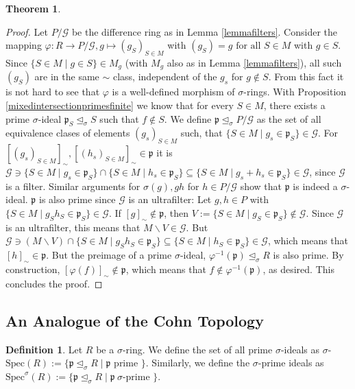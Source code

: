 \documentclass{article}
\def\p{\mathfrak{p}}
\def\s{\sigma}
\def\si{\unlhd_{\sigma}}
\def\Spec{\text{Spec}}
\def\fa{\text{ for all }}
\newenvironment{bew}{\begin{proof}[Proof]}{\end{proof}}
\theoremstyle{definition}
\newtheorem{theorem}[Satz]{Theorem}
\newtheorem{defn}[Satz]{Definition}
\begin{document}
\begin{theorem}
\begin{bew}
Let $P/\mathcal{G}$ be the difference ring as in Lemma \ref{lemmafilters}. Consider the mapping $\varphi: R \rightarrow P/\mathcal{G}, g \mapsto (g_S)_{S \in M}$ with $(g_S) = g \fa S \in M$ with $g \in S$. 
Since $\{ S \in M \mid g \in S \} \in M_g$ (with $M_g$ also as in Lemma \ref{lemmafilters}), all such $(g_S)$ are in the same $\sim$ class, independent of the $g_s$ for $g \notin S$. 
From this fact it is not hard to see that $\varphi$ is a well-defined morphism of $\s$-rings. 
With Proposition \ref{mixedintersectionprimesfinite} we know that for every $S \in M$, there exists a prime $\s$-ideal $\p_S \si S$ such that $f \notin S$. 
We define $\p \si P/\mathcal{G}$ as the set of all equivalence clases of elements $(g_s)_{S \in M}$ such, that $\{ S \in M \mid g_s \in \p_S \} \in \mathcal{G}$. 
For $[(g_s)_{S \in M}]_{\sim}, [(h_s)_{S \in M}]_{\sim} \in \p$ it is $ \mathcal{G} \ni \{ S \in M \mid  g_s \in \p_S \} \cap  \{ S \in M \mid  h_s \in \p_S \} \subseteq \{ S \in M \mid  g_s + h_s \in \p_S \} \in \mathcal{G}$,
since $\mathcal{G}$ is a filter. Similar arguments for $\s(g), gh$ for $h \in P/\mathcal{G}$ show that $\p$ is indeed a $\s$-ideal. $\p$ is also prime since $\mathcal{G}$ is an ultrafilter:
Let $g,h \in P$ with $\{ S \in M \mid g_Sh_S \in \p_S \} \in \mathcal{G}$. If $[g]_\sim \notin \p$, then $V:= \{ S \in M \mid g_S \in \p_S \} \notin \mathcal{G}$. Since $\mathcal{G}$ is an ultrafilter, 
this means that $M \backslash V \in \mathcal{G}$. But $\mathcal{G} \ni (M \backslash V) \cap \{ S \in M \mid g_S h_S \in \p_S \} \subseteq \{ S \in M \mid h_S \in \p_S \} \in \mathcal{G}$, which means that $[h]_\sim \in \p$.
But the preimage of a prime $\s$-ideal, $\varphi^{-1}(\p) \si R$ is also prime. By construction, $[\varphi(f)]_\sim \notin \p$, which means that $f \notin \varphi^{-1}(\p)$, as desired. This concludes the proof.

\end{bew}
\end{theorem}

\subsection{An Analogue of the Cohn Topology}

\begin{defn}
Let $R$ be a $\s$-ring. We define the set of all prime $\s$-ideals as $\s$-$\Spec(R):= \{ \p \si R \mid \p \text{ prime }\}$. Similarly, we define the $\s$-prime ideals as $\Spec^\s(R):= \{ \p \si R \mid \p ~ \s\text{-prime }\}$.
\end{defn}
\end{document}
